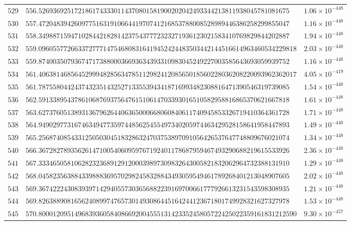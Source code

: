 \documentclass[12pt,reqno]{amsart}
\theoremstyle{remark}
\begin{document}
\begin{longtable}{clc}
$529$ & $556.5269369251721861743330114370801581900202042493344213811938045781081675$ & $1.06\times 10^{-448}$ \\
$530$ & $557.4720483942609775163191066441970741216853788008528989446386258299855047$ & $1.16\times 10^{-448}$ \\
$531$ & $558.3498871594710284421828142375437772323271936123021583410769829844202887$ & $1.94\times 10^{-448}$ \\
$532$ & $559.096055772663372777147546808316419452424483503442144516614963460534229818$ & $2.03\times 10^{-448}$ \\
$533$ & $559.8740035079367471738800036693634393310983045249227003585643693059939752$ & $1.16\times 10^{-448}$ \\
$534$ & $561.406381468564529994828563478511298241208565018560228036208220093962362017$ & $4.05\times 10^{-419}$ \\
$535$ & $561.7875580442437432351432527133553943418716993482308816471390546319739085$ & $1.54\times 10^{-448}$ \\
$536$ & $562.5913389543786106876937564761510614703393016510582958816865370621667818$ & $1.61\times 10^{-448}$ \\
$537$ & $563.6273760513893136796264406365000668060840611740945853326719410364361728$ & $1.71\times 10^{-448}$ \\
$538$ & $564.9490297731674634947735974485625455497340205974463429528158641958447893$ & $1.49\times 10^{-448}$ \\
$539$ & $565.2568740854331250503045183286324703753897091056426537647748809676021074$ & $1.34\times 10^{-448}$ \\
$540$ & $566.3672827893562614710054060959767192401178687959467493290688219615533926$ & $2.36\times 10^{-448}$ \\
$541$ & $567.3334650581062823236891291200039897309832643005821832062964732388131910$ & $1.29\times 10^{-448}$ \\
$542$ & $568.0458235638843398883695702982458328843493059549461789268401213048907605$ & $2.02\times 10^{-448}$ \\
$543$ & $569.3674222430839397142940557303656882239169700661777926613231543598308935$ & $1.21\times 10^{-448}$ \\
$544$ & $569.8263889081656240899747657301493086445164244123671801749928321627327978$ & $1.53\times 10^{-448}$ \\
$545$ & $570.800012095149683936058408669200455513142335245805722425022359161831212590$ & $9.30\times 10^{-457}$ \\

\end{longtable}
\end{document}
